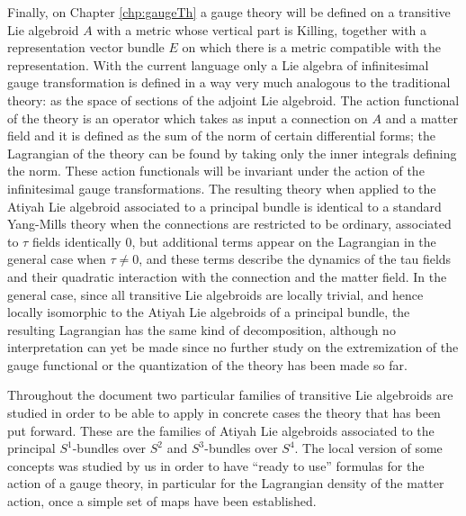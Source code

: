 Finally, on Chapter \ref{chp:gaugeTh} a gauge theory will be defined on a transitive Lie algebroid $A$ with a metric whose vertical part is Killing, together with a representation vector bundle $E$ on which there is a metric compatible with the representation. With the current language only a Lie algebra of infinitesimal gauge transformation is defined in a way very much analogous to the traditional theory: as the space of sections of the adjoint Lie algebroid. The action functional of the theory is an operator which takes as input a connection on $A$ and a matter field and it is defined as the sum of the norm of certain differential forms; the Lagrangian of the theory can be found by taking only the inner integrals defining the norm. These action functionals will be invariant under the action of the infinitesimal gauge transformations. The resulting theory when applied to the Atiyah Lie algebroid associated to a principal bundle is identical to a standard Yang-Mills theory when the connections are restricted to be ordinary, associated to $\tau$ fields identically $0$, but additional terms appear on the Lagrangian in the general case when $\tau \neq 0$, and these terms describe the dynamics of the tau fields and their quadratic interaction with the connection and the matter field. In the general case, since all transitive Lie algebroids are locally trivial, and hence locally isomorphic to the Atiyah Lie algebroids of a principal bundle, the resulting Lagrangian has the same kind of decomposition, although no interpretation can yet be made since no further study on the extremization of the gauge functional or the quantization of the theory has been made so far.

Throughout the document two particular families of transitive Lie algebroids are studied in order to be able to apply in concrete cases the theory that has been put forward. These are the families of Atiyah Lie algebroids associated to the principal $S^1$-bundles over $S^2$ and $S^3$-bundles over $S^4$. The local version of some concepts was studied by us in order to have ``ready to use'' formulas for the action of a gauge theory, in particular for the Lagrangian density of the matter action, once a simple set of maps have been established.

